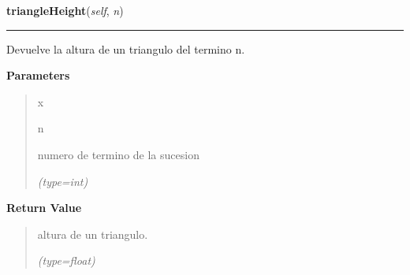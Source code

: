 \hspace{.8\funcindent}\begin{boxedminipage}{\funcwidth}

    \raggedright \textbf{triangleHeight}(\textit{self}, \textit{n})

    \vspace{-1.5ex}

    \rule{\textwidth}{0.5\fboxrule}
\setlength{\parskip}{2ex}
    Devuelve la altura de un triangulo del termino n.

\setlength{\parskip}{1ex}
      \textbf{Parameters}
      \vspace{-1ex}

      \begin{quote}
        \begin{Ventry}{x}

          \item[n]

          numero de termino de la sucesion

            {\it (type=int)}

        \end{Ventry}

      \end{quote}

      \textbf{Return Value}
    \vspace{-1ex}

      \begin{quote}
      altura de un triangulo.

      {\it (type=float)}

      \end{quote}

    \end{boxedminipage}

    \label{FractalZE:sierpinsky:Sierpinsky:trianglePerimeter}

    \vspace{0.5ex}

